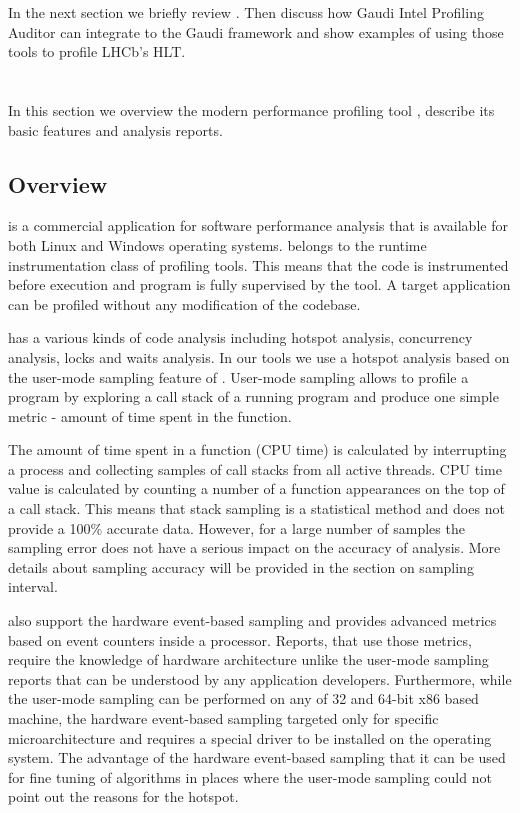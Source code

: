 \documentclass[a4paper]{jpconf}
\begin{document}
In the next section we briefly review \iamp. Then discuss how Gaudi Intel Profiling Auditor can integrate \amp to the Gaudi framework and show examples of using those tools to profile LHCb's HLT.

\section{\iamp}
In this section we overview the modern performance profiling tool \iamp, describe its basic features and analysis reports.

\subsection{Overview}
\iamp is a commercial application for software performance analysis that is available for both Linux and Windows operating systems. \amp belongs to the runtime instrumentation class of profiling tools. This means that the code is instrumented before execution and program is fully supervised by the tool. A target application can be profiled without any modification of the codebase.

\iamp has a various kinds of code analysis including hotspot analysis, concurrency analysis, locks and waits analysis. In our tools we use a hotspot analysis based on the user-mode  sampling feature of \amp. User-mode sampling allows to profile a program by exploring a call stack of a running program and produce one simple metric - amount of time spent in the function. 

The amount of time spent in a function (CPU time) is calculated by interrupting a process and collecting samples of call stacks from all active threads. CPU time value is calculated by counting a number of  a function appearances on the top of a call stack. This means that stack sampling is a statistical method and does not provide a 100\% accurate data. However, for a large number of samples the sampling error does not have a serious impact on the accuracy of analysis. More details about sampling accuracy will be provided in the section on sampling interval.

\amp also support the hardware event-based sampling and provides advanced metrics based on event counters inside a processor. Reports, that use those metrics,  require the knowledge of hardware architecture  unlike the user-mode sampling reports that can be understood by any application developers. Furthermore, while the user-mode sampling can be performed on any of 32 and 64-bit x86 based machine, the hardware event-based sampling targeted only for specific \intel microarchitecture and requires a special driver to be installed on the operating system. The advantage of the hardware event-based sampling that it can be used for fine tuning of algorithms in places where  the user-mode sampling could not point out the reasons for the hotspot.
\end{document}
